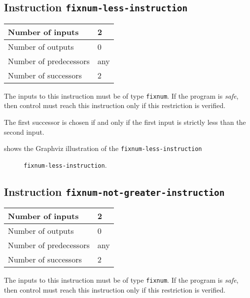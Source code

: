 \subsection{Instruction \texttt{fixnum-less-instruction}}
\label{mir-instruction-fixnum-less}

\begin{tabular}{|l|l|}
\hline
Number of inputs & 2\\
\hline
Number of outputs & 0\\
\hline
Number of predecessors & any\\
\hline
Number of successors & 2\\
\hline
\end{tabular}

The inputs to this instruction must be of type \texttt{fixnum}.  If
the program is \emph{safe}, then control must reach this instruction
only if this restriction is verified.

The first successor is chosen if and only if the first input is
strictly less than the second input.

 shows the Graphviz illustration of the
\texttt{fixnum-less-instruction}

\begin{figure}
\begin{center}
\end{center}
\caption{\label{fig-fixnum-less-instruction}
\texttt{fixnum-less-instruction}.}
\end{figure}

\subsection{Instruction \texttt{fixnum-not-greater-instruction}}
\label{mir-instruction-fixnum-le}

\begin{tabular}{|l|l|}
\hline
Number of inputs & 2\\
\hline
Number of outputs & 0\\
\hline
Number of predecessors & any\\
\hline
Number of successors & 2\\
\hline
\end{tabular}

The inputs to this instruction must be of type \texttt{fixnum}.  If
the program is \emph{safe}, then control must reach this instruction
only if this restriction is verified.

